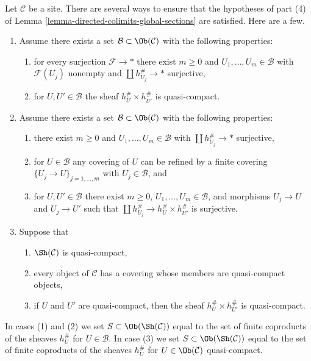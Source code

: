 \begin{remark}
\label{remark-stronger-conditions}
Let $\mathcal{C}$ be a site. There are several ways to ensure that
the hypotheses of part (4) of
Lemma \ref{lemma-directed-colimits-global-sections}
are satisfied. Here are a few.
\begin{enumerate}
\item Assume there exists a set $\mathcal{B} \subset \Ob(\mathcal{C})$
with the following properties:
\begin{enumerate}
\item for every surjection $\mathcal{F} \to *$ there
exist $m \geq 0$ and $U_1, \ldots, U_m \in \mathcal{B}$
with $\mathcal{F}(U_j)$ nonempty and $\coprod h_{U_j}^\# \to *$ surjective,
\item for $U, U' \in \mathcal{B}$ the sheaf $h_U^\# \times h_{U'}^\#$ is
quasi-compact.
\end{enumerate}
\item Assume there exists a set $\mathcal{B} \subset \Ob(\mathcal{C})$
with the following properties:
\begin{enumerate}
\item there exist $m \geq 0$ and $U_1, \ldots, U_m \in \mathcal{B}$
with $\coprod h_{U_j}^\# \to *$ surjective,
\item for $U \in \mathcal{B}$ any covering of $U$ can be
refined by a finite covering $\{U_j \to U\}_{j = 1, \ldots, m}$ with
$U_j \in \mathcal{B}$, and
\item for $U, U' \in \mathcal{B}$ there exist
$m \geq 0$, $U_1, \ldots, U_m \in \mathcal{B}$, and
morphisms $U_j \to U$ and $U_j \to U'$ such that
$\coprod h_{U_j}^\# \to h_U^\# \times h_{U'}^\#$ is surjective.
\end{enumerate}
\item Suppose that
\begin{enumerate}
\item $\Sh(\mathcal{C})$ is quasi-compact,
\item every object of $\mathcal{C}$ has a covering
whose members are quasi-compact objects,
\item if $U$ and $U'$ are quasi-compact, then the sheaf
$h_U^\# \times h_{U'}^\#$ is quasi-compact.
\end{enumerate}
\end{enumerate}
In cases (1) and (2) we set $S \subset \Ob(\Sh(\mathcal{C}))$ equal to the
set of finite coproducts of the sheaves $h_U^\#$ for $U \in \mathcal{B}$.
In case (3) we set $S \subset \Ob(\Sh(\mathcal{C}))$ equal to the
set of finite coproducts of the sheaves $h_U^\#$ for $U \in \Ob(\mathcal{C})$
quasi-compact.
\end{remark}

